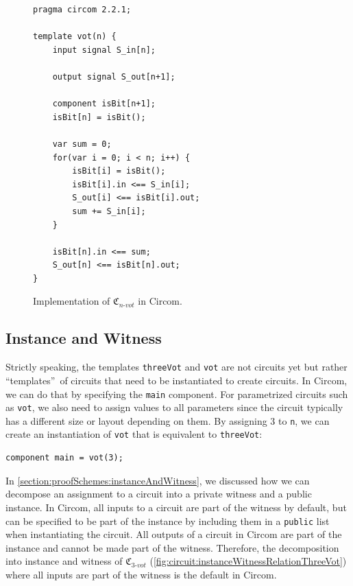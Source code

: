 \begin{figure}[h]
    \centering
    \captionsetup{type=listing}
    \begin{lstlisting}[language=Circom]
pragma circom 2.2.1;

template vot(n) {
    input signal S_in[n];

    output signal S_out[n+1];

    component isBit[n+1];
    isBit[n] = isBit();

    var sum = 0;
    for(var i = 0; i < n; i++) {
        isBit[i] = isBit();
        isBit[i].in <== S_in[i];
        S_out[i] <== isBit[i].out;
        sum += S_in[i];
    }

    isBit[n].in <== sum;
    S_out[n] <== isBit[n].out;
}\end{lstlisting}
    \caption{Implementation of $\mathfrak{C}_{n\text{-}vot}$ in Circom.}
    \label{fig:circom:nVot}
\end{figure}

\subsection{Instance and Witness}
Strictly speaking, the templates \verb|threeVot| and \verb|vot| are not circuits yet but rather ``templates''\ of circuits that need to be instantiated to create circuits.
In Circom, we can do that by specifying the \verb|main| component.
For parametrized circuits such as \verb|vot|, we also need to assign values to all parameters since the circuit typically has a different size or layout depending on them.
By assigning $3$ to \verb|n|, we can create an instantiation of \verb|vot| that is equivalent to \verb|threeVot|:

\begin{lstlisting}[language=Circom]
    component main = vot(3);
\end{lstlisting}

In \cref{section:proofSchemes:instanceAndWitness}, we discussed how we can decompose an assignment to a circuit into a private witness and a public instance.
In Circom, all inputs to a circuit are part of the witness by default, but can be specified to be part of the instance by including them in a \verb|public| list when instantiating the circuit.
All outputs of a circuit in Circom are part of the instance and cannot be made part of the witness.
Therefore, the decomposition into instance and witness of $\mathfrak{C}_{3\text{-}vot}$ (\cref{fig:circuit:instanceWitnessRelationThreeVot}) where all inputs are part of the witness is the default in Circom.

